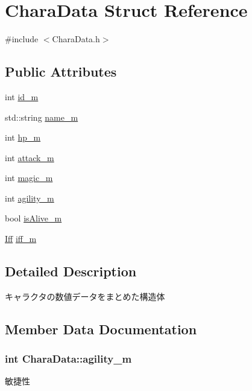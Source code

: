 \hypertarget{struct_chara_data}{}\section{Chara\+Data Struct Reference}
\label{struct_chara_data}


{\ttfamily \#include $<$Chara\+Data.\+h$>$}

\subsection*{Public Attributes}
\begin{DoxyCompactItemize}
\item 
int \hyperlink{struct_chara_data_a6254be2e5f02a77d30c48c0be2438609}{id\+\_\+m}
\item 
std\+::string \hyperlink{struct_chara_data_a96f453c506c225341d2752d4888d515e}{name\+\_\+m}
\item 
int \hyperlink{struct_chara_data_a7186ee61c28b6a84b0c7a41524ee7d01}{hp\+\_\+m}
\item 
int \hyperlink{struct_chara_data_a329e47c82a4348e2245713aeb51eced5}{attack\+\_\+m}
\item 
int \hyperlink{struct_chara_data_ad76e5c9e2a90755979af927101ec43ac}{magic\+\_\+m}
\item 
int \hyperlink{struct_chara_data_a9105941ccdf5e5cecd7a6eacb78ad9eb}{agility\+\_\+m}
\item 
bool \hyperlink{struct_chara_data_a87b4617204eaa6cb9a683389afb0647e}{is\+Alive\+\_\+m}
\item 
\hyperlink{_iff_8h_a2c0364e3d1fbdb7881a87792637f65f8}{Iff} \hyperlink{struct_chara_data_af593fbc602f98606ea757a0100f28083}{iff\+\_\+m}
\end{DoxyCompactItemize}


\subsection{Detailed Description}
キャラクタの数値データをまとめた構造体 

\subsection{Member Data Documentation}
\hypertarget{struct_chara_data_a9105941ccdf5e5cecd7a6eacb78ad9eb}{}
\subsubsection[{agility\+\_\+m}]{\setlength{\rightskip}{0pt plus 5cm}int Chara\+Data\+::agility\+\_\+m}\label{struct_chara_data_a9105941ccdf5e5cecd7a6eacb78ad9eb}
敏捷性 \hypertarget{struct_chara_data_a329e47c82a4348e2245713aeb51eced5}{}
